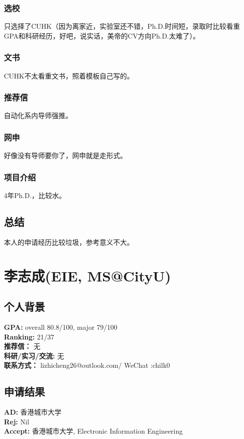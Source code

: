 \documentclass[a4paper,UTF8]{book}
\begin{document}
        \subsubsection*{选校}
        只选择了CUHK（因为离家近，实验室还不错，Ph.D.时间短，录取时比较看重GPA和科研经历，好吧，说实话，美帝的CV方向Ph.D.太难了）。

        \subsubsection*{文书}
        CUHK不太看重文书，照着模板自己写的。

        \subsubsection*{推荐信}
        自动化系内导师强推。

        \subsubsection*{网申}
        好像没有导师要你了，网申就是走形式。

        \subsubsection*{项目介绍}
        4年Ph.D.，比较水。

    \subsection*{总结}
    本人的申请经历比较垃圾，参考意义不大。

\clearpage
\section{李志成(EIE, MS@CityU)}
    \subsection*{个人背景}
        \textbf{GPA:} overall 80.8/100, major 79/100\\
        \textbf{Ranking:} 21/37\\
        \textbf{推荐信：} 无\\
        \textbf{科研/实习/交流:} 无\\ 
        \textbf{联系方式：} lizhicheng26@outlook.com/ WeChat :chilk0

    \subsection*{申请结果}
        \textbf{AD:} 香港城市大学\\
        \textbf{Rej:} Nil\\
        \textbf{Accept:} 香港城市大学, Electronic Information Engineering
\end{document}
